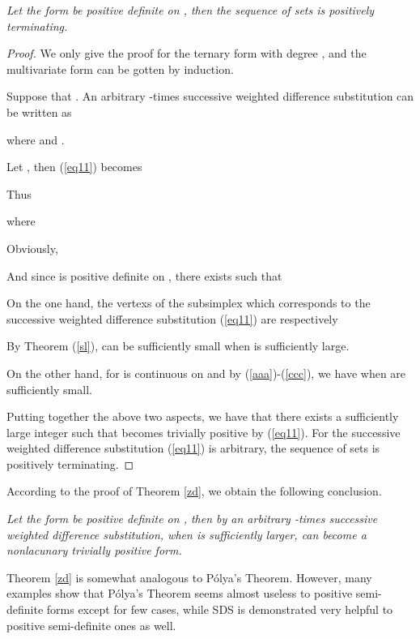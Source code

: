 \documentclass [10pt,a4paper]{article}
\begin{document}
\begin{theorem} \label{zd}
\emph{Let the form   be positive def\mbox{}inite on
, then the sequence of  sets
 is positively terminating.}
\end{theorem}
\begin{proof} We only give the proof for the ternary form with
degree , and the multivariate form can be gotten by induction.

Suppose that
. An
arbitrary -times successive weighted dif\mbox{}ference
substitution can be written as

where 
and .


Let , then (\ref{eq11})  becomes

Thus

where


Obviously,

And  since   is positive def\mbox{}inite on
,  there exists  such that



 On the one hand,   the  vertexs of the subsimplex which corresponds to the  successive weighted dif\mbox{}ference
 substitution (\ref{eq11})  are respectively
 
By Theorem (\ref{sl}),
  can be suf\mbox{}f\mbox{}iciently small
 when  is  suf\mbox{}f\mbox{}iciently  large.


 On the other hand, for  is continuous on  and by
 (\ref{aaa})-(\ref{ccc}), we have  when  are suf\mbox{}f\mbox{}iciently
 small.

Putting together the above two aspects,  we have that  there exists
a  suf\mbox{}f\mbox{}iciently  large integer   such that 
becomes trivially positive by (\ref{eq11}).
 For the successive weighted dif\mbox{}ference substitution (\ref{eq11}) is arbitrary, the sequence of  sets  is
positively terminating. \end{proof}

According to the proof of Theorem  \ref{zd}, we obtain the following
conclusion.

\begin{corollary}\label{zd111}
\emph{Let the form  be positive definite on ,  then
by an arbitrary -times successive weighted dif\mbox{}ference
substitution,  when  is suf\mbox{}f\mbox{}iciently larger,  
can become a nonlacunary  trivially positive  form.} \label{gzd}
\end{corollary}

Theorem  \ref{zd} is somewhat analogous to  P\'{o}lya's Theorem.
However,  many examples show that P\'{o}lya's Theorem seems almost
useless to positive semi-definite forms except for few cases, while
SDS is demonstrated very helpful to positive semi-definite ones as
well.
\end{document}
